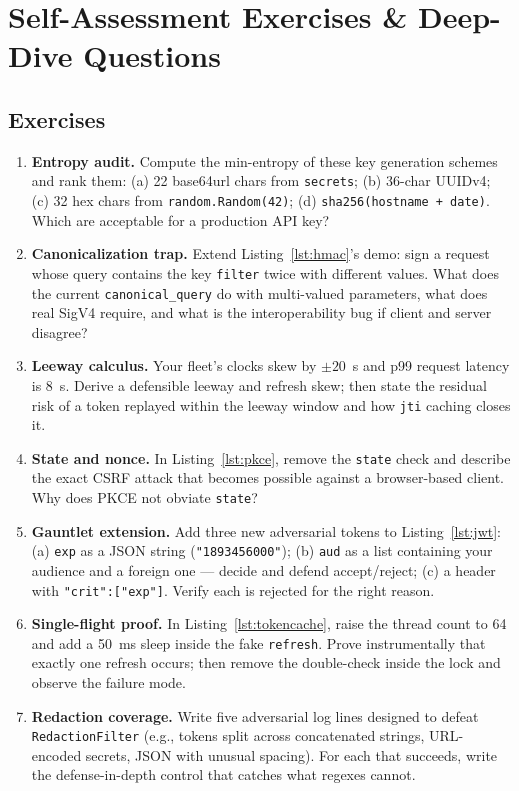 \section{Self-Assessment Exercises \& Deep-Dive Questions}
\label{sec:ch5-exercises}

\subsection*{Exercises}

\begin{enumerate}
  \item \textbf{Entropy audit.} Compute the min-entropy of these key
        generation schemes and rank them: (a) 22 base64url chars from
        \texttt{secrets}; (b) 36-char UUIDv4; (c) 32 hex chars from
        \texttt{random.Random(42)}; (d) \texttt{sha256(hostname + date)}.
        Which are acceptable for a production API key?
  \item \textbf{Canonicalization trap.} Extend Listing~\ref{lst:hmac}'s
        demo: sign a request whose query contains the key
        \texttt{filter} twice with different values. What does the current
        \texttt{canonical\_query} do with multi-valued parameters, what
        does real SigV4 require, and what is the interoperability bug if
        client and server disagree?
  \item \textbf{Leeway calculus.} Your fleet's clocks skew by $\pm 20$~s and
        p99 request latency is 8~s. Derive a defensible leeway and refresh
        skew; then state the residual risk of a token replayed within the
        leeway window and how \texttt{jti} caching closes it.
  \item \textbf{State and nonce.} In Listing~\ref{lst:pkce}, remove the
        \texttt{state} check and describe the exact CSRF attack that
        becomes possible against a browser-based client. Why does PKCE not
        obviate \texttt{state}?
  \item \textbf{Gauntlet extension.} Add three new adversarial tokens to
        Listing~\ref{lst:jwt}: (a) \texttt{exp} as a JSON string
        (\texttt{"1893456000"}); (b) \texttt{aud} as a list containing your
        audience and a foreign one --- decide and defend accept/reject;
        (c) a header with \texttt{"crit":["exp"]}. Verify each is rejected
        for the right reason.
  \item \textbf{Single-flight proof.} In Listing~\ref{lst:tokencache},
        raise the thread count to 64 and add a 50~ms sleep inside the fake
        \texttt{refresh}. Prove instrumentally that exactly one refresh
        occurs; then remove the double-check inside the lock and observe the
        failure mode.
  \item \textbf{Redaction coverage.} Write five adversarial log lines
        designed to defeat \texttt{RedactionFilter} (e.g., tokens split
        across concatenated strings, URL-encoded secrets, JSON with unusual
        spacing). For each that succeeds, write the defense-in-depth control
        that catches what regexes cannot.
\end{enumerate}

